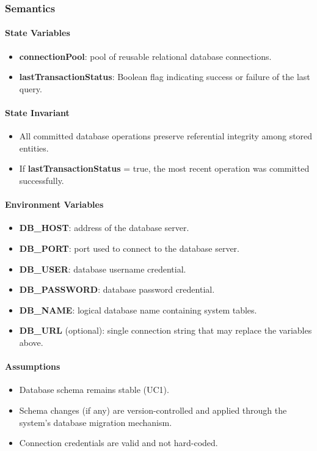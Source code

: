 \documentclass[12pt, titlepage]{article}
\begin{document}
\begin{itemize}
  \subsubsection{Semantics}

  \paragraph{State Variables}
  \begin{itemize}
    \item \textbf{connectionPool}: pool of reusable relational database connections.
    \item \textbf{lastTransactionStatus}: Boolean flag indicating success or failure of the last query.
  \end{itemize}

  \paragraph{State Invariant}
  \begin{itemize}
    \item All committed database operations preserve referential integrity among stored entities.
    \item If \textbf{lastTransactionStatus} = true, the most recent operation was committed successfully.
  \end{itemize}

  \paragraph{Environment Variables}
  \begin{itemize}
    \item \textbf{DB\_HOST}: address of the database server.
    \item \textbf{DB\_PORT}: port used to connect to the database server.
    \item \textbf{DB\_USER}: database username credential.
    \item \textbf{DB\_PASSWORD}: database password credential.
    \item \textbf{DB\_NAME}: logical database name containing system tables.
    \item \textbf{DB\_URL} (optional): single connection string that may replace the variables above.
  \end{itemize}

  \paragraph{Assumptions}
  \begin{itemize}
    \item Database schema remains stable (UC1).
    \item Schema changes (if any) are version-controlled and applied through the system’s database migration mechanism.
    \item Connection credentials are valid and not hard-coded.
  \end{itemize}


\end{itemize}
\end{document}
